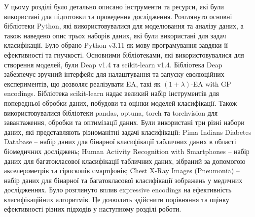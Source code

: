 У цьому розділі було детально описано інструменти та ресурси, які були використані для підготовки та проведення дослідження. Розглянуто основні бібліотеки Python, які використовувалися для моделювання та аналізу даних, а також наведено опис трьох наборів даних, які були використані для задач класифікації. Було обрано Python v3.11 як мову програмування завдяки її ефективності та гнучкості. Основними бібліотеками, які використовувалися для створення моделей, були Deap v1.4 та scikit-learn v1.4. Бібліотека Deap забезпечує зручний інтерфейс для налаштування та запуску еволюційних експериментів, що дозволяє реалізувати EA, такі як $(1+\lambda)$-EA with GP encodings. Бібліотека scikit-learn надає великий набір інструментів для попередньої обробки даних, побудови та оцінки моделей класифікації. Також використовувалися бібліотеки pandas, optuna, torch та torchvision для завантаження, обробки та оптимізації даних. Були використані три різні набори даних, які представляють різноманітні задачі класифікації: Pima Indians Diabetes Database -- набір даних для бінарної класифікації табличних даних в області біомедичних досліджень; Human Activity Recognition with Smartphones -- набір даних для багатокласової класифікації табличних даних, зібраний за допомогою акселерометрів та гіроскопів смартфонів; Chest X-Ray Images (Pneumonia) -- набір даних для бінарної та багатокласової класифікації зображень у медичних дослідженнях. Було розглянуто вплив expressive encodings на ефективність класифікаційних алгоритмів. Це дозволить здійснити порівняння та оцінку ефективності різних підходів у наступному розділі роботи.